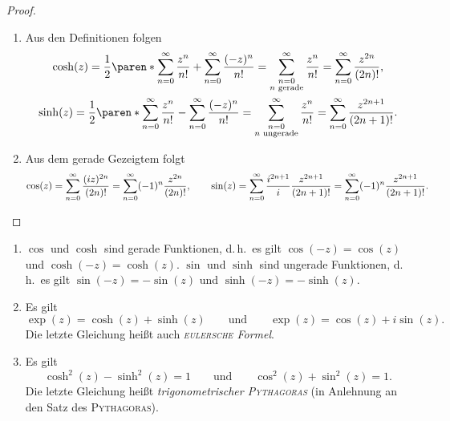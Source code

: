 \documentclass[a4paper]{article}
\begin{document}
\begin{proof}\leavevmode
    \begin{enumerate}
        \item Aus den Definitionen folgen
        \begin{gather*}
            \cosh(z) = \frac{1}{2} \paren*{\sum_{n=0}^\infty \frac{z^n}{n!} + \sum_{n=0}^\infty \frac{(-z)^n}{n!}} = \sum_{\substack{n=0\\n\text{ gerade}}}^\infty \frac{z^n}{n!} = \sum_{n=0}^\infty \frac{z^{2n}}{(2n)!}, \\
            \sinh(z) = \frac{1}{2} \paren*{\sum_{n=0}^\infty \frac{z^n}{n!} - \sum_{n=0}^\infty \frac{(-z)^n}{n!}} = \sum_{\substack{n=0\\n\text{ ungerade}}}^\infty \frac{z^n}{n!} = \sum_{n=0}^\infty \frac{z^{2n+1}}{(2n+1)!}.
        \end{gather*}
        \item Aus dem gerade Gezeigtem folgt
        \begin{equation*}
            \cos(z) = \sum_{n=0}^\infty \frac{(iz)^{2n}}{(2n)!} = \sum_{n=0}^\infty (-1)^n \frac{z^{2n}}{(2n)!}, \qquad \sin(z) = \sum_{n=0}^\infty \frac{i^{2n+1}}{i} \frac{z^{2n+1}}{(2n+1)!} = \sum_{n=0}^\infty (-1)^n \frac{z^{2n+1}}{(2n+1)!}. \qedhere
        \end{equation*}
    \end{enumerate}
\end{proof}

\begin{proposition}\leavevmode
    \begin{enumerate}
        \item $\cos$ und $\cosh$ sind gerade Funktionen, d.\,h.\ es gilt $\cos(-z) = \cos(z)$ und $\cosh(-z) = \cosh(z)$. $\sin$ und $\sinh$ sind ungerade Funktionen, d.\,h.\ es gilt $\sin(-z) = -\sin(z)$ und $\sinh(-z) = -\sinh(z)$.
        \item Es gilt
        \begin{equation*}
            \exp(z) = \cosh(z)+\sinh(z) \qquad\text{und}\qquad \exp(z) = \cos(z)+i\sin(z).
        \end{equation*}
        Die letzte Gleichung heißt auch \emph{\textsc{eulersche} Formel}.
        \item Es gilt
        \begin{equation*}
            \cosh^2(z) - \sinh^2(z) = 1 \qquad\text{und}\qquad \cos^2(z) + \sin^2(z) = 1.
        \end{equation*}
        Die letzte Gleichung heißt \emph{trigonometrischer \textsc{Pythagoras}} (in Anlehnung an den Satz des \textsc{Pythagoras}).
    \end{enumerate}
\end{proposition}
\end{document}
